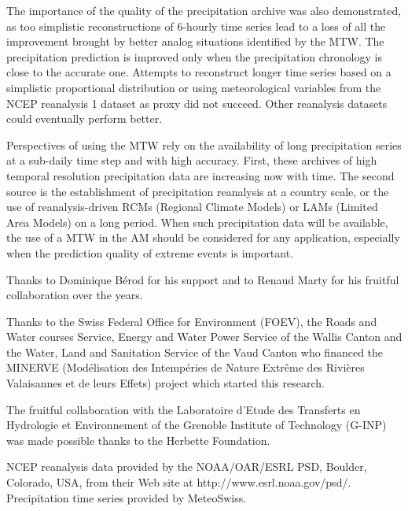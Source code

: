 \documentclass[hess, manuscript]{copernicus}
\begin{document}
The importance of the quality of the precipitation archive was also demonstrated, as too simplistic reconstructions of 6-hourly time series lead to a loss of all the improvement brought by better analog situations identified by the MTW. The precipitation prediction is improved only when the precipitation chronology is close to the accurate one. Attempts to reconstruct longer time series based on a simplistic proportional distribution or using meteorological variables from the NCEP reanalysis 1 dataset as proxy did not succeed. Other reanalysis datasets could eventually perform better.

Perspectives of using the MTW rely on the availability of long precipitation series at a sub-daily time step and with high accuracy. First, these archives of high temporal resolution precipitation data are increasing now with time. The second source is the establishment of precipitation reanalysis at a country scale, or the use of reanalysis-driven RCMs (Regional Climate Models) or LAMs (Limited Area Models) on a long period. When such precipitation data will be available, the use of a MTW in the AM should be considered for any application, especially when the prediction quality of extreme events is important.



\begin{acknowledgements}
Thanks to Dominique B\'{e}rod for his support and to Renaud Marty for his fruitful collaboration over the years. 

Thanks to the Swiss Federal Office for Environment (FOEV), the Roads and Water courses Service, Energy and Water Power Service of the Wallis Canton and the Water, Land and Sanitation Service of the Vaud Canton who financed the MINERVE (Mod\'{e}lisation des Intemp\'{e}ries de Nature Extr\^{e}me des Rivi\`{e}res Valaisannes et de leurs Effets) project which started this research. 

The fruitful collaboration with the Laboratoire d'Etude des Transferts en Hydrologie et Environnement of the Grenoble Institute of Technology (G-INP) was made possible thanks to the Herbette Foundation. 

NCEP reanalysis data provided by the NOAA/OAR/ESRL PSD, Boulder, Colorado, USA, from their Web site at http://www.esrl.noaa.gov/psd/. Precipitation time series provided by MeteoSwiss. 
\end{acknowledgements}



\end{document}
